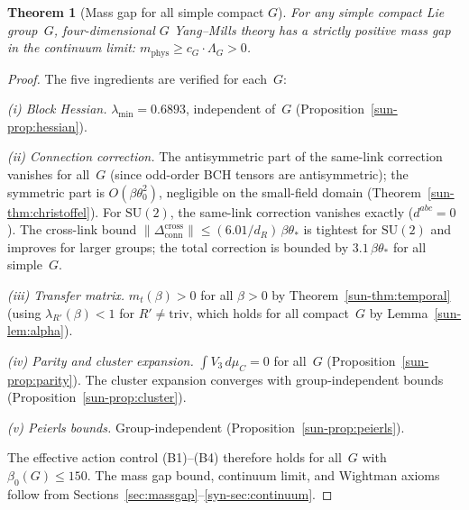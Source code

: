 \documentclass[11pt]{article}
\newtheorem{theorem}{Theorem}[section]
\theoremstyle{definition}
\newcommand{\SU}{\mathrm{SU}}
\begin{document}


\begin{theorem}[Mass gap for all simple compact $G$]
\label{sun-thm:general}
For any simple compact Lie group~$G$, four-dimensional
$G$ Yang--Mills theory has a strictly positive mass gap
in the continuum limit:
$m_{\mathrm{phys}}\ge c_G\cdot\Lambda_G>0$.
\end{theorem}

\begin{proof}
The five ingredients are verified for each~$G$:

\emph{(i) Block Hessian.}
$\lambda_{\min}=0.6893$, independent of~$G$
(Proposition~\ref{sun-prop:hessian}).

\emph{(ii) Connection correction.}
The antisymmetric part of the same-link correction
vanishes for all~$G$ (since odd-order BCH tensors are
antisymmetric); the symmetric part is
$O(\beta\theta_0^2)$, negligible on the small-field
domain (Theorem~\ref{sun-thm:christoffel}).
For $\SU(2)$, the same-link correction vanishes exactly
($d^{abc}=0$).  The cross-link
bound $\|\Delta_{\mathrm{conn}}^{\text{cross}}\|
\le(6.01/d_R)\,\beta\theta_*$ is tightest for $\SU(2)$
and improves for larger groups;
the total correction is bounded
by $3.1\,\beta\theta_*$ for all simple~$G$.

\emph{(iii) Transfer matrix.}
$m_t(\beta)>0$ for all $\beta>0$ by
Theorem~\ref{sun-thm:temporal} (using $\lambda_{R'}(\beta)<1$
for $R'\ne\text{triv}$, which holds for all compact~$G$
by Lemma~\ref{sun-lem:alpha}).

\emph{(iv) Parity and cluster expansion.}
$\int V_3\,d\mu_C=0$ for all~$G$
(Proposition~\ref{sun-prop:parity}).  The cluster expansion
converges with group-independent bounds
(Proposition~\ref{sun-prop:cluster}).

\emph{(v) Peierls bounds.}
Group-independent (Proposition~\ref{sun-prop:peierls}).

The effective action control (B1)--(B4) therefore holds
for all~$G$ with $\beta_0(G)\le 150$.  The mass gap
bound, continuum limit, and Wightman axioms follow
from Sections~\ref{sec:massgap}--\ref{syn-sec:continuum}.
\end{proof}
\end{document}
